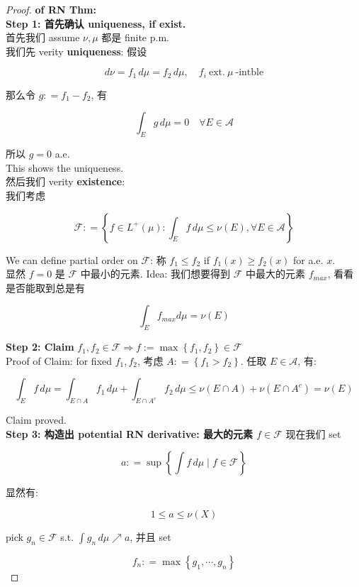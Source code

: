 \documentclass{qlnotes-export}
\begin{document}
\begin{proof}

\textbf{of RN Thm:}\\
\textbf{Step 1: 首先确认 uniqueness, if exist.}\\
首先我们 assume \(\nu,\mu\) 都是 finite p.m.\\
我们先 verity \textbf{uniqueness}: 假设

\[d\nu = f_{1}\, d\mu = f_{2}\, d\mu,\quad f_{i}\ \text{ext.}\ \mu\ \text{-intble}\]

那么令 \(g: = f_{1} - f_{2}\), 有

\[\int_{E}g\, d\mu = 0\quad\forall E \in \mathcal{A}\]

所以 \(g = 0\) a.e.\\
This shows the uniqueness.\\
然后我们 verity \textbf{existence}:\\
我们考虑

\[\mathcal{F}: = \left\{ {f \in L^{+}(\mu):\int_{E}f\, d\mu \leq \nu(E),\forall E \in \mathcal{A}} \right\}\]

We can define partial order on \(\mathcal{F}\): 称 \(f_{1} \leq f_{2}\) if \(f_{1}(x) \geq f_{2}(x)\) for a.e. \(x\).\\
显然 \(f = 0\) 是 \(\mathcal{F}\) 中最小的元素. Idea: 我们想要得到 \(\mathcal{F}\) 中最大的元素 \(f_{max}\), 看看是否能取到总是有

\[\int_{E}f_{max}d\mu = \nu(E)\]

\textbf{Step 2: Claim} \(f_{1},f_{2} \in \mathcal{F}\Longrightarrow f := \max\left\{ {f_{1},f_{2}} \right\} \in \mathcal{F}\)\\
Proof of Claim: for fixed \(f_{1},f_{2}\), 考虑 \(A: = \left\{ {f_{1} > f_{2}} \right\}\). 任取 \(E \in \mathcal{A}\), 有:

\[\int_{E}f\, d\mu = \int_{E \cap A}f_{1}\, d\mu + \int_{E \cap A^{c}}f_{2}\, d\mu \leq \nu(E \cap A) + \nu(E \cap A^{c}) = \nu(E)\]

Claim proved.\\
\textbf{Step 3: 构造出 potential RN derivative: 最大的元素 \(f \in \mathcal{F}\)} 现在我们 set

\[a: = \sup\left\{ {\int f\, d\mu \mid f \in \mathcal{F}} \right\}\]

显然有:

\[1 \leq a \leq \nu(X)\]

pick \(g_{n} \in \mathcal{F}\) s.t. \(\int g_{n}\, d\mu\operatorname{\nearrow ︎}a\), 并且 set

\[f_{n}: = \max\left\{ {g_{1},\cdots,g_{n}} \right\}\]


\end{proof}
\end{document}
